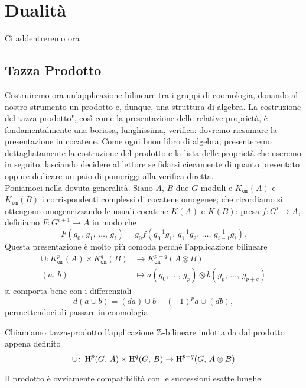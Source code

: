 \chapter{Dualità}
Ci addentreremo ora 

\section{Tazza Prodotto}
Costruiremo ora un'applicazione bilineare tra i gruppi di coomologia, donando al nostro strumento un prodotto e, dunque, una struttura di algebra. La costruzione del \leftquote tazza-prodotto", così come la presentazione delle relative proprietà, è fondamentalmente una boriosa, lunghissima, verifica: dovremo riesumare la presentazione in cocatene. Come ogni buon libro di algebra, presenteremo dettagliatamente la costruzione del prodotto e la lista delle proprietà che useremo in seguito, lasciando decidere al lettore se fidarsi ciecamente di quanto presentato oppure dedicare un paio di pomeriggi alla verifica diretta. \\

Poniamoci nella dovuta generalità. Siano $ A, \, B $ due $ G $-moduli e $ K_{\mathtt{om}}(A) $ e $ K_{\mathtt{om}}(B) $ i corrispondenti complessi di cocatene omogenee; che ricordiamo si ottengono omogeneizzando le usuali cocatene $ K(A) $ e $ K(B) $: presa $ f \colon G^i \to A $, definiamo $ F\colon G^{i+1} \to A  $ in modo che
\[ F(g_0, \, g_1, \, \dots, \, g_i) = g_0 f(g_0^{-1}g_1, \, g_1^{-1}g_2, \, \dots, \, g_{i-1}^{-1}g_i). \]
Questa presentazione è molto più comoda perché l'applicazione bilineare
\begin{align*}
	\cup \colon K^p_{\mathtt{om}}(A) \times K^q_{\mathtt{om}}(B) &\to K_{\mathtt{om}}^{p+q}(A \otimes B)\\
	(a, \, b) & \mapsto a(g_0,\, \dots, \, g_p) \otimes b(g_p,\, \dots, \, g_{p+q})
\end{align*}
si comporta bene con i differenziali
\[ d(a \cup b) = (da) \cup b + (-1)^p a \cup (db), \]
permettendoci di passare in coomologia.

\begin{definition}
	Chiamiamo tazza-prodotto l'applicazione $ \mathbb{Z} $-bilineare indotta da dal prodotto appena definito
	\[ \cup \colon \operatorname{H}^p(G, \, A) \times \operatorname{H}^q(G, \, B) \to \operatorname{H}^{p+q}(G, \, A \otimes B)  \]
\end{definition}

Il prodotto è ovviamente compatibilità con le successioni esatte lunghe:

